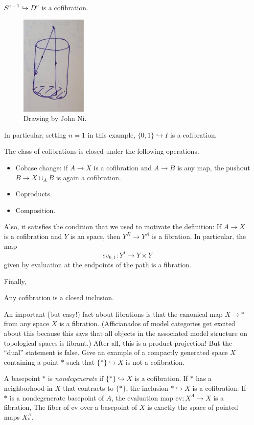 \begin{example}\label{intervalcofib}
    $S^{n-1}\hookrightarrow D^n$ is a cofibration.
    \begin{figure}[H]
	\centering
	\includegraphics[scale=0.75]{retract-cofibration}
	\caption{Drawing by John Ni.}
    \end{figure}
    In particular, setting $n=1$ in this example, $\{0,1\}\hookrightarrow I$ is a cofibration.
\end{example}

The class of cofibrations is closed under the following operations.
\begin{itemize}
    \item Cobase change: if $A\to X$ is a cofibration and $A\to B$ is any map,
	the pushout $B\to X\cup_A B$ is again a cofibration.
    \item Coproducts.
    \item Composition.
\end{itemize}
Also, it satisfies the condition that we used to motivate the definition:
If $A\to X$ is a cofibration and $Y$ is an space, then $Y^X\to Y^A$ is a 
fibration. In particular, the map 
\[
ev_{0,1}:Y^I\to Y\times Y
\]
given by evaluation at the endpoints of the path is a fibration.

Finally, 
\begin{lemma} 
Any cofibration is a closed inclusion.
\end{lemma}

\begin{exercise}
An important (but easy!) fact about fibrations is that the canonical map 
$X\to \ast$ from any space $X$ is a fibration.
(Afficianados of model categories get excited about this 
because this says that all objects in the associated model structure on
topological spaces is fibrant.)
After all, this is a product projection! 
But the ``dual'' statement is false.    
Give an example of a compactly generated space $X$ containing a point
$*$ such that $\{*\}\hookrightarrow X$ is not a cofibration.
\end{exercise}
A basepoint $*$ is {\em nondegenerate} if $\{*\}\hookrightarrow X$ 
is a cofibration. 
If $\ast$ has a neighborhood in $X$ that contracts to $\{\ast\}$,
the inclusion $\ast\hookrightarrow X$ is a cofibration.
If $\ast$ is a nondegenerate basepoint of $A$, the evaluation map 
$\mathrm{ev}:X^A\to X$ is a fibration,
The fiber of $\mathrm{ev}$ over a basepoint of $X$ 
is exactly the space of pointed maps $X^A_*$.
